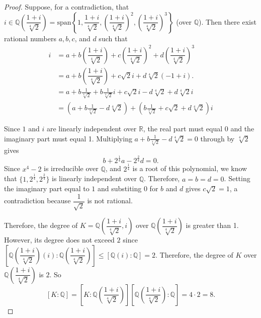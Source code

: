 \documentclass[10pt]{article}
\newcommand{\Q}{\mathbb{Q}}
\begin{document}
\begin{enumerate}[leftmargin=0cm,itemindent=.5cm,labelwidth=\itemindent,labelsep=0cm,align=left]
\begin{proof}
Suppose, for a contradiction, that $i \in \Q \left( \dfrac{1+i}{\sqrt[4]{2}} \right) = \text{span} \left\{ 1, \dfrac{1+i}{\sqrt[4]{2}}, \left( \dfrac{1+i}{\sqrt[4]{2}} \right)^2, \left( \dfrac{1+i}{\sqrt[4]{2}} \right)^3 \right\}$ %
(over $\Q$).  Then there exist rational numbers $a,b,c$, and $d$ such that
\begin{align*}
i &= a + b \left( \dfrac{1+i}{\sqrt[4]{2}} \right) + c \left( \dfrac{1+i}{\sqrt[4]{2}} \right)^2 + d \left( \dfrac{1+i}{\sqrt[4]{2}} \right)^3
\\
&= a + b \left( \dfrac{1+i}{\sqrt[4]{2}} \right) + c \sqrt{2}i + d \sqrt[4]{2}(-1+i).
\\
&= a + b\frac{1}{\sqrt[4]{2}} + b\frac{1}{\sqrt[4]{2}}i + c\sqrt{2}i - d\sqrt[4]{2} + d\sqrt[4]{2}i
\\
&= \left( a + b\frac{1}{\sqrt[4]{2}} - d\sqrt[4]{2} \right) + \left( b\frac{1}{\sqrt[4]{2}} + c\sqrt{2} + d\sqrt[4]{2} \right)i
\end{align*}

\noindent Since $1$ and $i$ are linearly independent over $\mathbb{R}$, the real part must equal $0$ and the imaginary part must equal 1.  Multiplying $a + b\frac{1}{\sqrt[4]{2}} - d\sqrt[4]{2} = 0$ through by $\sqrt[4]{2}$ gives $$b + 2^{\frac{1}{4}} a - 2^{\frac{2}{4}} d = 0.$$  Since $x^4 - 2$ is irreducible over $\Q$, and $2^{\frac{1}{4}}$ is a root of this polynomial, we know that $\{1, 2^{\frac{1}{4}}, 2^{\frac{2}{4}} \}$ is linearly independent over $\Q$.  Therefore, $a = b = d = 0$.  Setting the imaginary part equal to $1$ and substiting $0$ for $b$ and $d$ gives $c\sqrt{2} = 1$, a contradiction because $\dfrac{1}{\sqrt{2}}$ is not rational.

Therefore, the degree of $K = \Q \left( \dfrac{1+i}{\sqrt[4]{2}}, i \right)$ over $\Q \left( \dfrac{1+i}{\sqrt[4]{2}} \right)$ is greater than 1.  However, its degree does not exceed $2$ since $\left[ \Q \left( \dfrac{1+i}{\sqrt[4]{2}} \right) \left( i \right) : \Q \left( \dfrac{1+i}{\sqrt[4]{2}} \right) \right] \leq \left[ \Q(i) : \Q \right] = 2$.  Therefore, the degree of $K$ over $\Q \left( \dfrac{1+i}{\sqrt[4]{2}} \right)$ is $2$.  So $$[K : \Q] = \left[ K : \Q \left( \dfrac{1+i}{\sqrt[4]{2}} \right) \right] \left[ \Q \left( \dfrac{1+i}{\sqrt[4]{2}} \right) : \Q \right] = 4 \cdot 2 = 8.$$

\end{proof}


\end{enumerate}
\end{document}
